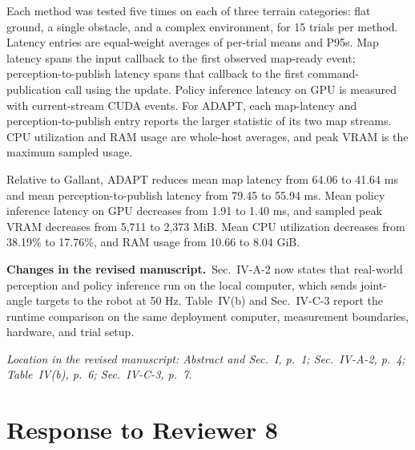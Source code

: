 \documentclass[11pt]{article}
\newcommand{\Changes}{\par\noindent\textbf{Changes in the revised manuscript.}\ }
\newcommand{\Location}[1]{\par\noindent\textit{Location in the revised manuscript: #1}}
\begin{document}
Each method was tested five times on each of three terrain categories: flat ground, a single obstacle, and a complex environment, for 15 trials per method. Latency entries are equal-weight averages of per-trial means and P95s. Map latency spans the input callback to the first observed map-ready event; perception-to-publish latency spans that callback to the first command-publication call using the update. Policy inference latency on GPU is measured with current-stream CUDA events. For ADAPT, each map-latency and perception-to-publish entry reports the larger statistic of its two map streams. CPU utilization and RAM usage are whole-host averages, and peak VRAM is the maximum sampled usage.

Relative to Gallant, ADAPT reduces mean map latency from 64.06 to 41.64 ms and mean perception-to-publish latency from 79.45 to 55.94 ms. Mean policy inference latency on GPU decreases from 1.91 to 1.40 ms, and sampled peak VRAM decreases from 5,711 to 2,373 MiB. Mean CPU utilization decreases from 38.19\% to 17.76\%, and RAM usage from 10.66 to 8.04 GiB.
\Changes Sec.~IV-A-2 now states that real-world perception and policy inference run on the local computer, which sends joint-angle targets to the robot at 50 Hz. Table~IV(b) and Sec.~IV-C-3 report the runtime comparison on the same deployment computer, measurement boundaries, hardware, and trial setup.


\Location{Abstract and Sec.~I, p.~1; Sec.~IV-A-2, p.~4; Table~IV(b), p.~6; Sec.~IV-C-3, p.~7.}

\clearpage
\section*{Response to Reviewer 8}
\end{document}
